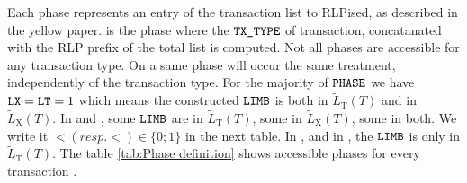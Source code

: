 Each phase represents an entry of the transaction list to RLPised, as described in the yellow paper. \phaseRlpPrefix{} is the phase where the $\texttt{TX\_TYPE}$ of transaction, concatanated with the RLP prefix of the total list is computed. Not all phases are accessible for any transaction type. On a same phase will occur the same treatment, independently of the transaction type. For the majority of $\texttt{PHASE}$ we have $\texttt{LX} = \texttt{LT} =1$ which means the constructed $\texttt{LIMB}$ is both in $\widetilde{L}_{\mathrm{T}}(T)$ and in  $\widetilde{L}_{\mathrm{X}}(T)$. In \phaseRlpPrefix{} and \phaseBeta{}, some $\texttt{LIMB}$ are in $\widetilde{L}_{\mathrm{T}}(T)$, some in  $\widetilde{L}_{\mathrm{X}}(T)$, some in both. We write it $\lt (resp. \lt) \in \{0 ; 1\}$ in the next table. In \phaseY{}, \phaseR{} and in \phaseS{}, the $\texttt{LIMB}$ is only in $\widetilde{L}_{\mathrm{T}}(T)$. The table \ref{tab:Phase definition} shows accessible phases for every transaction \transactionType. 

